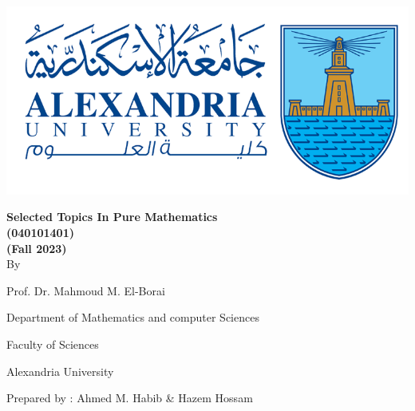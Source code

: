 \begingroup
{}
\begin{center}
    \includegraphics[scale=.5]{collage logo.png}
    \vspace*{1.5cm}
    \par
    {\fontsize{20pt}{30pt}\selectfont
        \textbf{Selected Topics In Pure Mathematics\\(040101401)\\(Fall 2023)}
        \\
        \vspace*{.75cm}
        By
        \vspace*{.75cm}

        Prof. Dr. Mahmoud M. El-Borai

        Department of Mathematics and computer Sciences

        Faculty of Sciences

        Alexandria University
    }

    \vspace*{\fill}
    {\fontsize{10pt}{10pt}\selectfont
    Prepared by : Ahmed M. Habib \& Hazem Hossam
    }
\end{center}
\restoregeometry
\endgroup
\newpage
\tableofcontents
\thispagestyle{empty}
\newpage
\setcounter{page}{1}